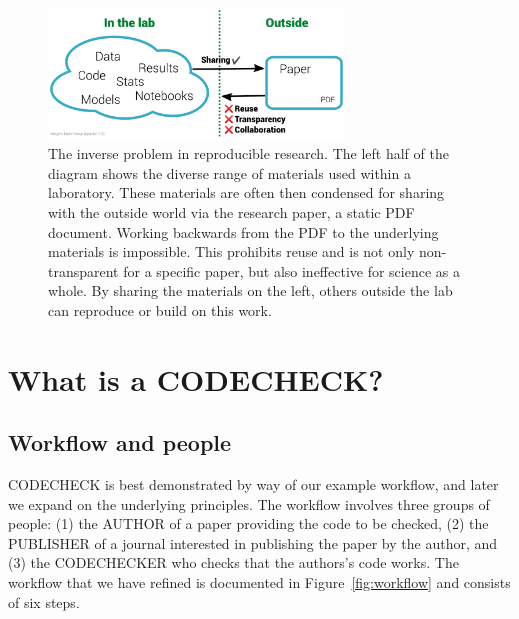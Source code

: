 \documentclass[12pt]{article}
\begin{document}
\begin{figure}
  \centering
  \includegraphics[width=0.7\textwidth]{figs/rr.pdf}
  \caption{The inverse problem in reproducible research.  The left
  half of the diagram shows the diverse range of materials used
  within a laboratory.  These materials are often then
  condensed for sharing with the outside world via the
  research paper, a static PDF document.  Working backwards from the
  PDF to the underlying materials is impossible. This prohibits reuse
  and is not only non-transparent for a specific paper, but also 
  ineffective for science as a whole. By sharing the
  materials on the left, others outside the lab can reproduce
  or build on this work.}
  \label{fig:inverse}
\end{figure}

\section*{What is a CODECHECK?}\label{what-is-a-codecheck}

\subsection*{Workflow and people}\label{workflow-people}

CODECHECK is best demonstrated by way of our example workflow, and later
we expand on the underlying principles. The workflow involves three
groups of people:
(1) the AUTHOR of a paper providing the code to be checked,
(2) the PUBLISHER of a journal interested in publishing the paper 
by the author, and
(3) the CODECHECKER who checks that the authors's code works.
The workflow that we have refined is documented in Figure~\ref{fig:workflow}
and consists of six steps.
\end{document}
